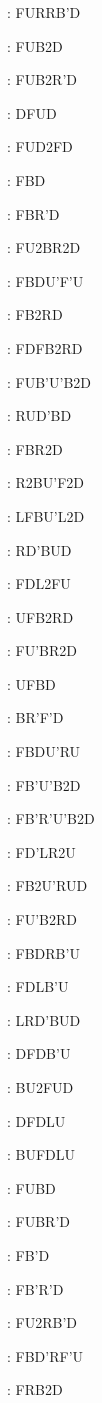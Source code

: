 \documentclass[9pt]{article}
\begin{document}
{\begin{multicols}{6}
: FURRB'D

: FUB2D

: FUB2R'D

: DFUD

: FUD2FD

: FBD

: FBR'D

: FU2BR2D

: FBDU'F'U

: FB2RD

: FDFB2RD

: FUB'U'B2D

: RUD'BD

: FBR2D

: R2BU'F2D

: LFBU'L2D

: RD'BUD

: FDL2FU

: UFB2RD

: FU'BR2D

: UFBD

: BR'F'D

: FBDU'RU

: FB'U'B2D

: FB'R'U'B2D

: FD'LR2U

: FB2U'RUD

: FU'B2RD

: FBDRB'U

: FDLB'U

: LRD'BUD

: DFDB'U

: BU2FUD

: DFDLU

: BUFDLU

: FUBD

: FUBR'D

: FB'D

: FB'R'D

: FU2RB'D

: FBD'RF'U

: FRB2D


\end{multicols}}
\end{document}
